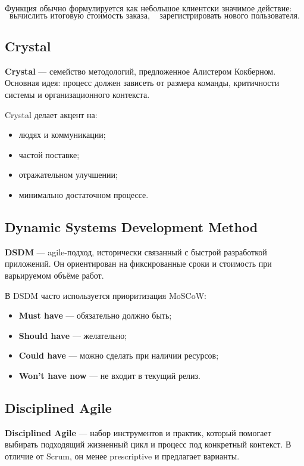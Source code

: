 \documentclass[12pt,a4paper]{article}
\begin{document}
Функция обычно формулируется как небольшое клиентски значимое действие:
\[
\text{вычислить итоговую стоимость заказа},
\quad
\text{зарегистрировать нового пользователя}.
\]

\subsection{Crystal}

\textbf{Crystal} --- семейство методологий, предложенное Алистером Кокберном. Основная идея: процесс должен зависеть от размера команды, критичности системы и организационного контекста.

Crystal делает акцент на:
\begin{itemize}
    \item людях и коммуникации;
    \item частой поставке;
    \item отражательном улучшении;
    \item минимально достаточном процессе.
\end{itemize}

\subsection{Dynamic Systems Development Method}

\textbf{DSDM} --- agile-подход, исторически связанный с быстрой разработкой приложений. Он ориентирован на фиксированные сроки и стоимость при варьируемом объёме работ.

В DSDM часто используется приоритизация MoSCoW:
\begin{itemize}
    \item \textbf{Must have} --- обязательно должно быть;
    \item \textbf{Should have} --- желательно;
    \item \textbf{Could have} --- можно сделать при наличии ресурсов;
    \item \textbf{Won't have now} --- не входит в текущий релиз.
\end{itemize}

\subsection{Disciplined Agile}

\textbf{Disciplined Agile} --- набор инструментов и практик, который помогает выбирать подходящий жизненный цикл и процесс под конкретный контекст. В отличие от Scrum, он менее prescriptive и предлагает варианты.
\end{document}
